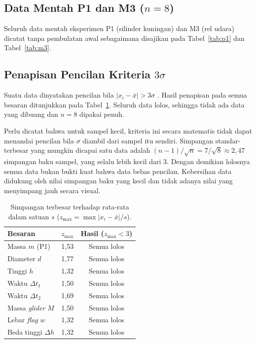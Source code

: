 \documentclass[a4paper, 12pt]{article}
\begin{document}
\subsection{Data Mentah P1 dan M3 (\texorpdfstring{$n=8$}{n=8})}
        Seluruh data mentah eksperimen P1 (silinder kuningan) dan M3 (rel udara) dicatat tanpa pembulatan awal sebagaimana disajikan pada Tabel~\ref{tab:p1} dan Tabel~\ref{tab:m3}.

        \subsection{Penapisan Pencilan Kriteria \texorpdfstring{$3\sigma$}{3 sigma}}
        Suatu data dinyatakan pencilan bila $|x_i-\bar{x}|>3\sigma$ \parencite{Taylor1997}. Hasil penapisan pada semua besaran ditunjukkan pada Tabel~\ref{tab:z}. Seluruh data lolos, sehingga tidak ada data yang dibuang dan $n=8$ dipakai penuh.

        Perlu dicatat bahwa untuk sampel kecil, kriteria ini secara matematis tidak dapat menandai pencilan bila $\sigma$ diambil dari sampel itu sendiri. Simpangan standar-terbesar yang mungkin dicapai satu data adalah $(n-1)/\sqrt{n}=7/\sqrt{8}\approx 2{,}47$ simpangan baku sampel, yang selalu lebih kecil dari $3$. Dengan demikian lolosnya semua data bukan bukti kuat bahwa data bebas pencilan. Kebersihan data didukung oleh nilai simpangan baku yang kecil dan tidak adanya nilai yang menyimpang jauh secara visual.


\begin{table}[H]
\centering
\singlespacing
\caption{Simpangan terbesar terhadap rata-rata dalam satuan $s$ ($z_{\max}=\max|x_i-\bar{x}|/s$).}
\label{tab:z}
\small
\begin{tabular}{l c c}
\toprule
\textbf{Besaran} & $z_{\max}$ & \textbf{Hasil ($z_{\max}<3$)}\\
\midrule
Massa $m$ (P1) & 1,53 & Semua lolos\\
Diameter $d$ & 1,77 & Semua lolos\\
Tinggi $h$ & 1,32 & Semua lolos\\
Waktu $\Delta t_1$ & 1,50 & Semua lolos\\
Waktu $\Delta t_2$ & 1,69 & Semua lolos\\
Massa \textit{glider} $M$ & 1,50 & Semua lolos\\
Lebar \textit{flag} $w$ & 1,32 & Semua lolos\\
Beda tinggi $\Delta h$ & 1,32 & Semua lolos\\
\bottomrule
\end{tabular}
\end{table}
\end{document}

